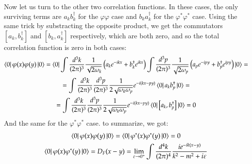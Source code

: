 \documentclass{article}
\begin{document}
\newline
Now let us turn to the other two correlation functions. In these cases, the only surviving terms are $a_k b_k^\dagger$ for the $\varphi\varphi$ case and $b_k a_k^\dagger$ for the $\varphi^*\varphi^*$ case. Using the same trick by substracting the opposite product, we get the commutators $[a_k, b_k^\dagger]$ and $[b_k, a_k^\dagger]$ respectively, which are both zero, and so the total correlation function is zero in both cases:
\begin{equation}
\begin{gathered}
    \bra{0}\varphi(x)\varphi(y)\ket{0} = \bra{0}\int \frac{d^3k}{(2\pi)^3}\frac{1}{\sqrt{2\omega_k}}\left(
        a_k e^{-ikx} + b_k^\dagger e^{ikx}
    \right) \int \frac{d^3p}{(2\pi)^3}\frac{1}{\sqrt{2\omega_p}}\left(
        a_p e^{-ipy} + b_p^\dagger e^{ipy}
    \right)\ket{0} = \\ =
    \int \frac{d^3k}{(2\pi)^3}\frac{d^3p}{(2\pi)^3}\frac{1}{2\sqrt{\omega_k\omega_p}} e^{-i(kx - py)} \bra{0}a_k b_p^\dagger\ket{0} = \\ =
    \int \frac{d^3k}{(2\pi)^3}\frac{d^3p}{(2\pi)^3}\frac{1}{2\sqrt{\omega_k\omega_p}} e^{-i(kx - py)} \bra{0}\left[a_k, b_p^\dagger\right]\ket{0} = 0
\end{gathered}
\end{equation}
And the same for the $\varphi^*\varphi^*$ case. to summarize, we got:
\begin{equation}
\begin{gathered}
    \bra{0}\varphi(x)\varphi(y)\ket{0} = \bra{0}\varphi^*(x)\varphi^*(y)\ket{0} = 0
    \\
    \bra{0}\varphi(x)\varphi^*(y)\ket{0} = D_F(x - y) = \lim_{\varepsilon \rightarrow 0^{+}}\int \frac{d^4k}{(2\pi)^4}\frac{ie^{-ik(x - y)}}{k^2 - m^2 + i\varepsilon}
\end{gathered}
\end{equation}
\end{document}
